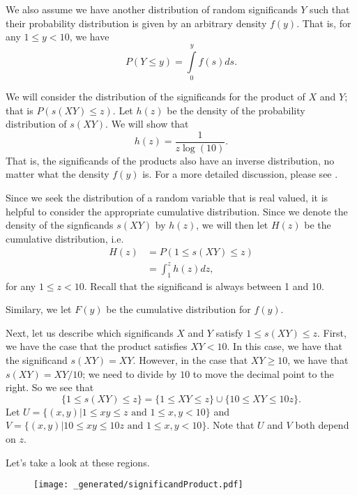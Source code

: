 We also assume we have another distribution of random significands \(Y\) such that their probability distribution is given by an 
arbitrary density \(f(y)\). That is, for any \(1 \leq y < 10\), we have 
\begin{equation}
P\left(Y \leq y\right) = \int \limits_0^y f(s) ds.
\end{equation}

We will consider the distribution of the significands for the product of \(X\) and \(Y\); that is \(P(s(XY) \leq z)\). Let \(h(z)\) be the density of the probability
distribution of \(s(XY)\). We will show that
\begin{equation}
h(z) = \frac{1}{z\log(10)}.
\end{equation}
That is, the significands of the products also have an inverse distribution, no matter what the density \(f(y)\) is. For a more detailed discussion, please see \cite{Hamming}.

Since we seek the distribution of a random variable that is real valued, it is helpful to consider the appropriate cumulative distribution. Since we denote the density of 
the signficands \(s(XY)\) by \(h(z)\), we will then let \(H(z)\) be the cumulative distribution, i.e. 
\begin{align}
H(z) & = P(1 \leq s(XY) \leq z) \\
    & = \int_1^z h(z) dz,
\end{align}
for any \(1 \leq z < 10\). Recall that the significand is always between 1 and 10.

Similary, we let \(F(y)\) be the cumulative distribution for \(f(y)\).

Next, let us describe which significands \(X\) and \(Y\) satisfy \(1 \leq s(XY) \leq z\). First, we have the case that the product satisfies \(XY < 10\). In this case, we have that
the significand \(s(XY) = XY\). However, in the case that \(XY \geq 10\), we have that \(s(XY) = XY / 10\); we need to divide by \(10\) to move the decimal point to the right. So we
see that
\begin{equation}
\{1 \leq s(XY) \leq z\} = \{1 \leq XY \leq z\} \cup \{10 \leq XY \leq 10z\}.
\end{equation}
Let \(U = \{(x, y) | 1 \leq xy \leq z \text{ and } 1\leq x,y < 10\}\) 
and \(V = \{(x, y) | 10 \leq xy \leq 10z \text{ and } 1\leq x, y < 10\}\). Note that \(U\) and \(V\) both depend on \(z\).

Let's take a look at these regions.

\begin{figure}[h]
\centering
\texttt{[image: \_generated/significandProduct.pdf]}
\end{figure}

